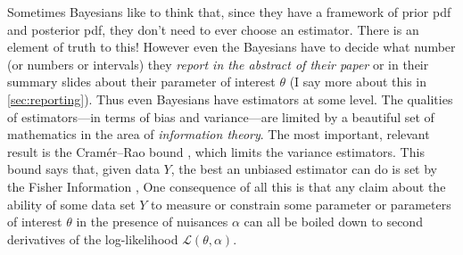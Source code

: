 \documentclass{article}
\begin{document}
Sometimes Bayesians like to think that, since they have a framework of prior pdf and posterior pdf, they don't need to ever choose an estimator.
There is an element of truth to this!
However even the Bayesians have to decide what number (or numbers or intervals) they \emph{report in the abstract of their paper} or in their summary slides about their parameter of interest $\theta$ (I say more about this in \ref{sec:reporting}).
Thus even Bayesians have estimators at some level.
The qualities of estimators---in terms of bias and variance---are limited by a beautiful set of mathematics in the area of \emph{information theory}.
The most important, relevant result is the Cram\'er--Rao bound \cite{cramer, rao}, which limits the variance estimators.
This bound says that, given data $Y$, the best an unbiased estimator can do is set by the Fisher Information \cite{fisher},
One consequence of all this is that any claim about the ability of some data set $Y$ to measure or constrain some parameter or parameters of interest $\theta$ in the presence of nuisances $\alpha$ can all be boiled down to second derivatives of the log-likelihood $\mathscr{L}(\theta,\alpha)$.
\end{document}
